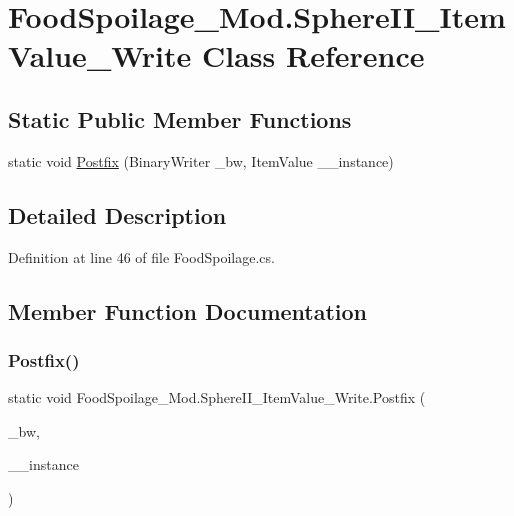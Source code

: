 \hypertarget{class_food_spoilage___mod_1_1_sphere_i_i___item_value___write}{}\section{Food\+Spoilage\+\_\+\+Mod.\+Sphere\+I\+I\+\_\+\+Item\+Value\+\_\+\+Write Class Reference}
\label{class_food_spoilage___mod_1_1_sphere_i_i___item_value___write}
\subsection*{Static Public Member Functions}
\begin{DoxyCompactItemize}
\item 
static void \mbox{\hyperlink{class_food_spoilage___mod_1_1_sphere_i_i___item_value___write_abd7fbb22845d9e20c70562ac6793ddbc}{Postfix}} (Binary\+Writer \+\_\+bw, Item\+Value \+\_\+\+\_\+instance)
\end{DoxyCompactItemize}


\subsection{Detailed Description}


Definition at line 46 of file Food\+Spoilage.\+cs.



\subsection{Member Function Documentation}
\mbox{\label{class_food_spoilage___mod_1_1_sphere_i_i___item_value___write_abd7fbb22845d9e20c70562ac6793ddbc}} 
\subsubsection{\texorpdfstring{Postfix()}{Postfix()}}
{\footnotesize\ttfamily static void Food\+Spoilage\+\_\+\+Mod.\+Sphere\+I\+I\+\_\+\+Item\+Value\+\_\+\+Write.\+Postfix (\begin{DoxyParamCaption}\item[{Binary\+Writer}]{\+\_\+bw,  }\item[{Item\+Value}]{\+\_\+\+\_\+instance }\end{DoxyParamCaption})\hspace{0.3cm}{\ttfamily [static]}}



